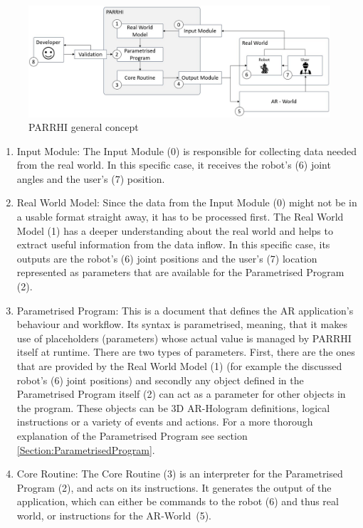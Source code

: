 \begin{figure}[h]
	\centering
	\includegraphics[width=1\textwidth]{Figures/PARRHIConcept03.jpg}
	\caption{PARRHI general concept}
	\label{Fig:PARRHIConcept}
\end{figure}

\begin{enumerate}
	\addtocounter{enumi}{-1}
	\setlength\itemsep{-1em}
	\item Input Module: The Input Module (0) is responsible for collecting data needed from the real world. In this specific case, it  receives the robot's (6) joint angles and the user's (7) position.
	\item Real World Model: Since the data from the Input Module (0) might not be in a usable format straight away, it has to be processed first. The Real World Model (1) has a deeper understanding about the real world and helps to extract useful information from the data inflow. In this specific case, its outputs are the robot's (6) joint positions and the user's (7) location represented as parameters that are available for the Parametrised Program (2).
	\item Parametrised Program: This is a document that defines the AR application's behaviour and workflow. Its syntax is parametrised, meaning, that it makes use of placeholders (parameters) whose actual value is managed by PARRHI itself at runtime. There are two types of parameters. First, there are the ones that are provided by the Real World Model (1) (for example the discussed robot's (6) joint positions) and secondly any object defined in the Parametrised Program itself (2) can act as a parameter for other objects in the program. These objects can be 3D AR-Hologram definitions, logical instructions or a variety of events and actions. For a more thorough explanation of the Parametrised Program see section \ref{Section:ParametrisedProgram}.
	\item Core Routine: The Core Routine (3) is an interpreter for the Parametrised Program (2), and acts on its instructions. It generates the output of the application, which can either be commands to the robot (6) and thus real world, or instructions for the AR-World~(5).

\end{enumerate}
